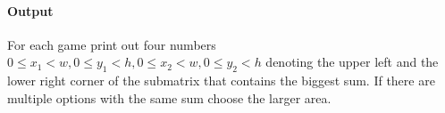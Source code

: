 \paragraph*{Output}

For each game print out four numbers $0\leq x_1 < w, 0\leq y_1 < h, 0\leq x_2 < w, 0 \leq y_2 < h$ denoting the upper left and the lower right corner of the submatrix that contains the biggest sum.
If there are multiple options with the same sum choose the larger area.


\begin{samples}
\end{samples}





    
    
    




           



